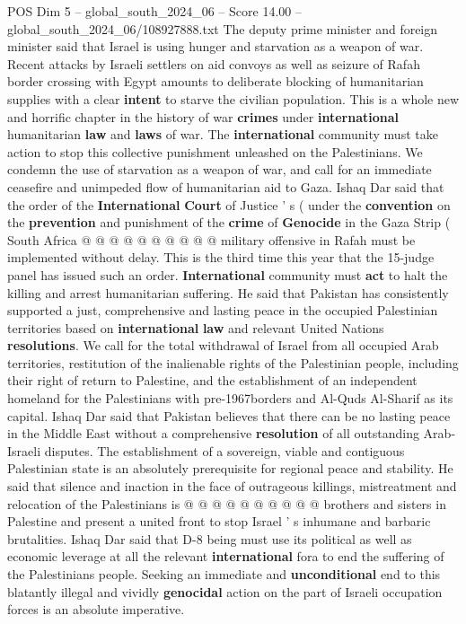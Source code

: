 \begin{textsample}{POS Dim 5 – global\_south\_2024\_06 – Score 14.00 – global\_south\_2024\_06/108927888.txt}
The deputy prime minister and foreign minister said that Israel is using hunger and starvation as a weapon of war.
Recent attacks by Israeli settlers on aid convoys as well as seizure of Rafah border crossing with Egypt amounts to deliberate blocking of humanitarian supplies with a clear \textbf{intent} to starve the civilian population.
This is a whole new and horrific chapter in the history of war \textbf{crimes} under \textbf{international} humanitarian \textbf{law} and \textbf{laws} of war.
The \textbf{international} community must take action to stop this collective punishment unleashed on the Palestinians.
We condemn the use of starvation as a weapon of war, and call for an immediate ceasefire and unimpeded flow of humanitarian aid to Gaza.
Ishaq Dar said that the order of the \textbf{International} \textbf{Court} of Justice ' s ( under the \textbf{convention} on the \textbf{prevention} and punishment of the \textbf{crime} of \textbf{Genocide} in the Gaza Strip ( South Africa @ @ @ @ @ @ @ @ @ @ military offensive in Rafah must be implemented without delay.
This is the third time this year that the 15-judge panel has issued such an order. \textbf{International} community must \textbf{act} to halt the killing and arrest humanitarian suffering.
He said that Pakistan has consistently supported a just, comprehensive and lasting peace in the occupied Palestinian territories based on \textbf{international} \textbf{law} and relevant United Nations \textbf{resolutions}.
We call for the total withdrawal of Israel from all occupied Arab territories, restitution of the inalienable rights of the Palestinian people, including their right of return to Palestine, and the establishment of an independent homeland for the Palestinians with pre-1967borders and Al-Quds Al-Sharif as its capital.
Ishaq Dar said that Pakistan believes that there can be no lasting peace in the Middle East without a comprehensive \textbf{resolution} of all outstanding Arab-Israeli disputes.
The establishment of a sovereign, viable and contiguous Palestinian state is an absolutely prerequisite for regional peace and stability.
He said that silence and inaction in the face of outrageous killings, mistreatment and relocation of the Palestinians is @ @ @ @ @ @ @ @ @ @ brothers and sisters in Palestine and present a united front to stop Israel ' s inhumane and barbaric brutalities.
Ishaq Dar said that D-8 being must use its political as well as economic leverage at all the relevant \textbf{international} fora to end the suffering of the Palestinians people.
Seeking an immediate and \textbf{unconditional} end to this blatantly illegal and vividly \textbf{genocidal} action on the part of Israeli occupation forces is an absolute imperative.

\end{textsample}
